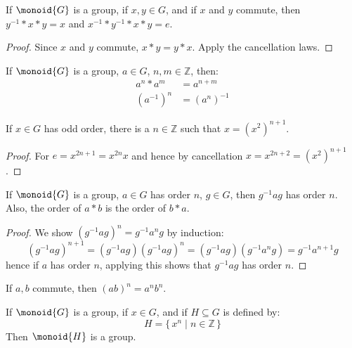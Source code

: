 \documentclass{article}                                                        %
\begin{document}
        \begin{theorem}
            If $\monoid{G}$ is a group, if $x,y\in{G}$, and if $x$ and $y$
            commute, then $y^{\minus{1}}*x*y=x$ and
            $x^{\minus{1}}*y^{\minus{1}}*x*y=e$.
        \end{theorem}
        \begin{proof}
            Since $x$ and $y$ commute, $x*y=y*x$. Apply the cancellation laws.
        \end{proof}
        \begin{theorem}
            If $\monoid{G}$ is a group, $a\in{G}$, $n,m\in\mathbb{Z}$, then:
            \begin{align}
                a^{n}*a^{m}&=a^{n+m}\\
                (a^{\minus{1}})^{n}&=(a^{n})^{\minus{1}}
            \end{align}
        \end{theorem}
        \begin{theorem}
            If $x\in{G}$ has odd order, there is a $n\in\mathbb{Z}$ such that
            $x=(x^{2})^{n+1}$.
        \end{theorem}
        \begin{proof}
            For $e=x^{2n+1}=x^{2n}x$ and hence by cancellation
            $x=x^{2n+2}=(x^{2})^{n+1}$.
        \end{proof}
        \begin{theorem}
            If $\monoid{G}$ is a group, $a\in{G}$ has order $n$, $g\in{G}$,
            then $g^{\minus{1}}ag$ has order $n$. Also, the order of $a*b$ is
            the order of $b*a$.
        \end{theorem}
        \begin{proof}
            We show $(g^{\minus{1}}ag)^{n}=g^{\minus{1}}a^{n}g$ by induction:
            \begin{equation}
                (g^{\minus{1}}ag)^{n+1}=(g^{\minus{1}}ag)(g^{\minus{1}}ag)^{n}
                =(g^{\minus{1}}ag)(g^{\minus{1}}a^{n}g)
                =g^{\minus{1}}a^{n+1}g
            \end{equation}
            hence if $a$ has order $n$, applying this shows that
            $g^{\minus{1}}ag$ has order $n$.
        \end{proof}
        \begin{theorem}
            If $a,b$ commute, then $(ab)^{n}=a^{n}b^{n}$.
        \end{theorem}
        \begin{theorem}
            If $\monoid{G}$ is a group, if $x\in{G}$, and if $H\subseteq{G}$ is
            defined by:
            \begin{equation}
                H=\{\,x^{n}\;|\;n\in\mathbb{Z}\,\}
            \end{equation}
            Then $\monoid{H}$ is a group.
        \end{theorem}
\end{document}
